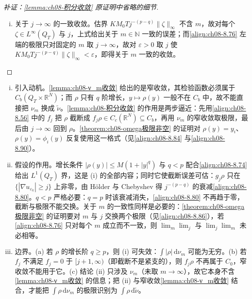 \documentclass[../../main.tex]{subfiles}%
\begin{document}
\begin{proof}[补证：\cref{lemma:ch08-积分收敛} 原证明中省略的细节]
\begin{enumerate}[(i)]
\item 关于 $j\to\infty$ 的一致收敛。估界 $KM_0Tj^{-(p-q)}\|\zeta\|_\infty$ 不含 $m$，故对每个 $\zeta\in L^\infty(Q_T)$ 与 $j$，上式给出关于 $m\in\mathbb{N}$ 一致的误差；而\eqref{align:ch08-8.76} 左端的极限只对固定的 $m$ 取 $j\to\infty$，故对 $\varepsilon>0$ 取 $j$ 使 $KM_0Tj^{-(p-q)}\|\zeta\|_\infty<\varepsilon$，即得关于 $m$ 一致的收敛。
\end{enumerate}
\end{proof}

\begin{remark}\label{remark:ch08-积分收敛}
\begin{enumerate}[(i)]
\item 引入动机。\cref{lemma:ch08-ν_m收敛} 给出的是窄收敛，其检验函数必须属于 $C_b(Q_T\times\mathbb{R}^N)$；而 $\rho$ 只有 $q$ 阶增长，$y\mapsto\rho(y)$ 一般不在 $C_b$ 中，故不能直接把 $\nu_m$ 换成 $\tilde\nu$。\cref{lemma:ch08-积分收敛} 的作用是两步逼近：先用\eqref{align:ch08-8.56} 中的 $f_j$ 把 $\rho$ 截断成 $f_j\rho\in C_c(\mathbb{R}^N)\subseteq C_b$，再用 $\nu_m$ 的窄收敛取极限，最后由 $j\to\infty$ 回到 $\rho$。\cref{theorem:ch08-omega极限非空} 的证明对 $\rho(y)=y_i$、$\rho(y)=\phi_i(y)$ 反复使用这一格式（见\eqref{align:ch08-8.84} 与\eqref{align:ch08-8.90}）。
\item 假设的作用。增长条件 $|\rho(y)|\leqslant M(1+|y|^q)$ 与 $q<p$ 配合\eqref{align:ch08-8.74} 给出 $L^1(Q_T)$ 界，这是 (i) 的全部内容；同时它使截断误差可估：$g_j\rho$ 只在 $\{|\nabla u_{\varepsilon_k}|\geqslant j\}$ 上非零，由 Hölder 与 Chebyshev 得 $j^{-(p-q)}$ 的衰减\eqref{align:ch08-8.80}。$q<p$ 严格必要：$q=p$ 时该衰减消失，\eqref{align:ch08-8.80} 不再趋于零，截断与极限不能交换。关于 $m$ 的一致性同样是必要的：\cref{theorem:ch08-omega极限非空} 的证明要对 $m$ 与 $j$ 交换两个极限（见\eqref{align:ch08-8.86}），若\eqref{align:ch08-8.76} 只对每个 $m$ 成立而不一致，则 $\lim_m\lim_j$ 与 $\lim_j\lim_m$ 未必相等。
\item 边界。(a) 若 $\rho$ 的增长阶 $q\geqslant p$，则 (i) 可失效：$\int|\rho|\,\mathrm{d}\nu_m$ 可能为无穷。(b) 若 $f_j$ 不满足 $f_j=0$ 于 $[j+1,\infty)$（即截断不是紧支的），则 $f_j\rho$ 不再属于 $C_0$，窄收敛不能用于它。(c) 结论 (ii) 只涉及 $\nu_m$（未取 $m\to\infty$），故它本身不含\cref{lemma:ch08-ν_m收敛} 的信息；把 (ii) 与窄收敛\cref{lemma:ch08-ν_m收敛} 结合，才能把 $\int\rho\,\mathrm{d}\nu_m$ 的极限识别为 $\int\rho\,\mathrm{d}\tilde\nu$。
\end{enumerate}
\end{remark}
\end{document}
